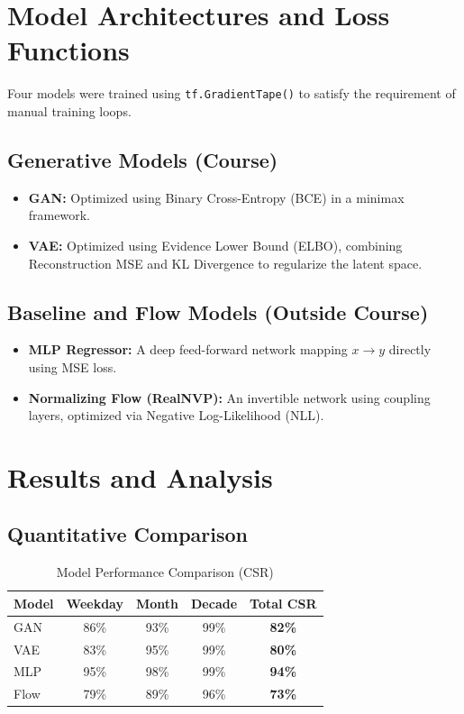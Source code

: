 \documentclass[12pt, a4paper]{article}
\begin{document}
\section{Model Architectures and Loss Functions}
Four models were trained using \texttt{tf.GradientTape()} to satisfy the requirement of manual training loops.

\subsection{Generative Models (Course)}
\begin{itemize}
    \item \textbf{GAN:} Optimized using Binary Cross-Entropy (BCE) in a minimax framework.
    \item \textbf{VAE:} Optimized using Evidence Lower Bound (ELBO), combining Reconstruction MSE and KL Divergence to regularize the latent space.
\end{itemize}

\subsection{Baseline and Flow Models (Outside Course)}
\begin{itemize}
    \item \textbf{MLP Regressor:} A deep feed-forward network mapping $x \to y$ directly using MSE loss.
    \item \textbf{Normalizing Flow (RealNVP):} An invertible network using coupling layers, optimized via Negative Log-Likelihood (NLL).
\end{itemize}

\section{Results and Analysis}

\subsection{Quantitative Comparison}
\begin{table}[H]
    \centering
    \caption{Model Performance Comparison (CSR)}
    \begin{tabular}{lcccc}
        \toprule
        Model & Weekday & Month & Decade & \textbf{Total CSR} \\
        \midrule
        GAN   & 86\% & 93\% & 99\% & \textbf{82\%} \\
        VAE   & 83\% & 95\% & 99\% & \textbf{80\%} \\
        MLP   & 95\% & 98\% & 99\% & \textbf{94\%} \\
        Flow  & 79\% & 89\% & 96\% & \textbf{73\%} \\
        \bottomrule
    \end{tabular}
\end{table}
\end{document}
